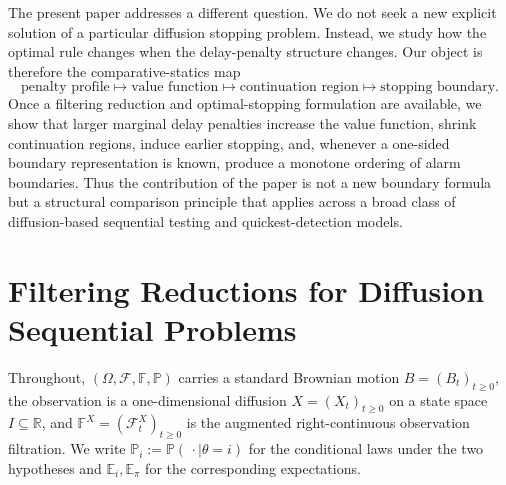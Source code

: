 \documentclass[pdflatex,sn-mathphys-num]{sn-jnl}
\theoremstyle{plain}
\theoremstyle{definition}
\newcommand{\R}{\mathbb{R}}
\newcommand{\E}{\mathbb{E}}
\newcommand{\PR}{\mathbb{P}}
\newcommand{\Filt}{\mathbb{F}}
\newcommand{\Fx}{\mathcal{F}}
\begin{document}
The present paper addresses a different question. We do not seek a new
explicit solution of a particular diffusion stopping problem. Instead, we
study how the optimal rule changes when the delay-penalty structure changes.
Our object is therefore the comparative-statics map
\[
\text{penalty profile}
\longmapsto
\text{value function}
\longmapsto
\text{continuation region}
\longmapsto
\text{stopping boundary}.
\]
Once a filtering reduction and optimal-stopping formulation are available,
we show that larger marginal delay penalties increase the value function,
shrink continuation regions, induce earlier stopping, and, whenever a
one-sided boundary representation is known, produce a monotone ordering of
alarm boundaries. Thus the contribution of the paper is not a new boundary
formula but a structural comparison principle that applies across a broad
class of diffusion-based sequential testing and quickest-detection models.


\section{Filtering Reductions for Diffusion Sequential Problems}\label{sec:filter}

Throughout, $(\Omega,\Fx,\Filt,\PR)$ carries a standard Brownian motion
$B=(B_t)_{t\ge0}$, the observation is a one-dimensional diffusion
$X=(X_t)_{t\ge0}$ on a state space $I\subseteq\R$, and $\Filt^X=(\Fx^X_t)_{t\ge0}$
is the augmented right-continuous observation filtration. We write
$\PR_i:=\PR(\,\cdot\mid\theta=i)$ for the conditional laws under the two
hypotheses and $\E_i,\E_\pi$ for the corresponding expectations.
\end{document}

